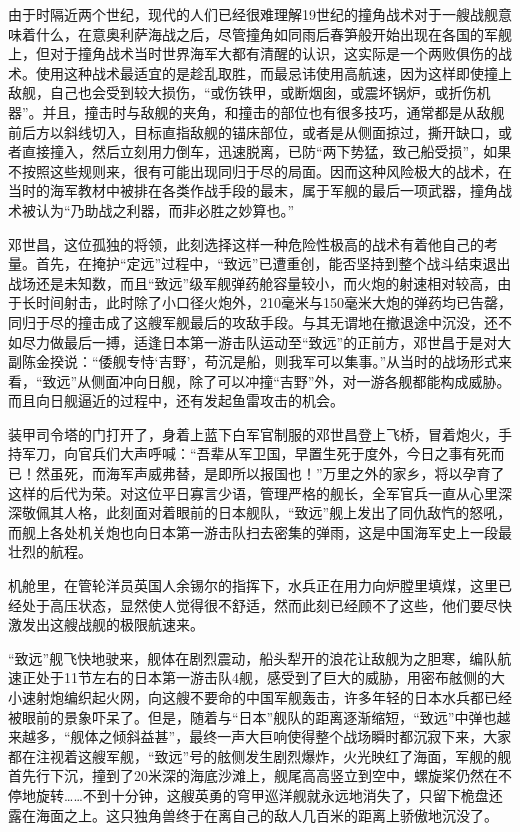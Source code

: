 \documentclass[12pt,UTF8]{ctexbook}
\begin{document}
由于时隔近两个世纪，现代的人们已经很难理解19世纪的撞角战术对于一艘战舰意味着什么，在意奥利萨海战之后，尽管撞角如同雨后春笋般开始出现在各国的军舰上，但对于撞角战术当时世界海军大都有清醒的认识，这实际是一个两败俱伤的战术。使用这种战术最适宜的是趁乱取胜，而最忌讳使用高航速，因为这样即使撞上敌舰，自己也会受到较大损伤，“或伤铁甲，或断烟囱，或震坏锅炉，或折伤机器”。并且，撞击时与敌舰的夹角，和撞击的部位也有很多技巧，通常都是从敌舰前后方以斜线切入，目标直指敌舰的锚床部位，或者是从侧面掠过，撕开缺口，或者直接撞入，然后立刻用力倒车，迅速脱离，已防“两下势猛，致己船受损”，如果不按照这些规则来，很有可能出现同归于尽的局面。因而这种风险极大的战术，在当时的海军教材中被排在各类作战手段的最末，属于军舰的最后一项武器，撞角战术被认为“乃助战之利器，而非必胜之妙算也。”

邓世昌，这位孤独的将领，此刻选择这样一种危险性极高的战术有着他自己的考量。首先，在掩护“定远”过程中，“致远”已遭重创，能否坚持到整个战斗结束退出战场还是未知数，而且“致远”级军舰弹药舱容量较小，而火炮的射速相对较高，由于长时间射击，此时除了小口径火炮外，210毫米与150毫米大炮的弹药均已告罄，同归于尽的撞击成了这艘军舰最后的攻敌手段。与其无谓地在撤退途中沉没，还不如尽力做最后一搏，适逢日本第一游击队运动至“致远”的正前方，邓世昌于是对大副陈金揆说：“倭舰专恃‘吉野’，苟沉是船，则我军可以集事。”从当时的战场形式来看，“致远”从侧面冲向日舰，除了可以冲撞“吉野”外，对一游各舰都能构成威胁。而且向日舰逼近的过程中，还有发起鱼雷攻击的机会。

装甲司令塔的门打开了，身着上蓝下白军官制服的邓世昌登上飞桥，冒着炮火，手持军刀，向官兵们大声呼喊：“吾辈从军卫国，早置生死于度外，今日之事有死而已！然虽死，而海军声威弗替，是即所以报国也！”万里之外的家乡，将以孕育了这样的后代为荣。对这位平日寡言少语，管理严格的舰长，全军官兵一直从心里深深敬佩其人格，此刻面对着眼前的日本舰队，“致远”舰上发出了同仇敌忾的怒吼，而舰上各处机关炮也向日本第一游击队扫去密集的弹雨，这是中国海军史上一段最壮烈的航程。

机舱里，在管轮洋员英国人余锡尔的指挥下，水兵正在用力向炉膛里填煤，这里已经处于高压状态，显然使人觉得很不舒适，然而此刻已经顾不了这些，他们要尽快激发出这艘战舰的极限航速来。

“致远”舰飞快地驶来，舰体在剧烈震动，船头犁开的浪花让敌舰为之胆寒，编队航速正处于11节左右的日本第一游击队4舰，感受到了巨大的威胁，用密布舷侧的大小速射炮编织起火网，向这艘不要命的中国军舰轰击，许多年轻的日本水兵都已经被眼前的景象吓呆了。但是，随着与“日本”舰队的距离逐渐缩短，“致远”中弹也越来越多，“舰体之倾斜益甚”，最终一声大巨响使得整个战场瞬时都沉寂下来，大家都在注视着这艘军舰，“致远”号的舷侧发生剧烈爆炸，火光映红了海面，军舰的舰首先行下沉，撞到了20米深的海底沙滩上，舰尾高高竖立到空中，螺旋桨仍然在不停地旋转……不到十分钟，这艘英勇的穹甲巡洋舰就永远地消失了，只留下桅盘还露在海面之上。这只独角兽终于在离自己的敌人几百米的距离上骄傲地沉没了。
\end{document}
